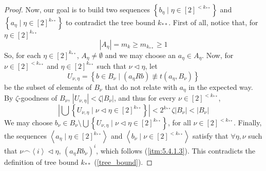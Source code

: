 \begin{proof}
            Now, our goal is to build two sequences $\left\{ b_\eta \mid \eta \in [2]^{<k_{**}} \right\}$ and
            $\left\{ a_\eta \mid \eta \in [2]^{k_{**}} \right\}$ to contradict the tree bound $k_{**}$.
            First of all, notice that, for $\eta \in [2]^{k_{**}}$
            $$
                |A_\eta| = m_k \geq m_{k_{**}} \geq 1
            $$
            So, for each $\eta \in [2]^{k_{**}}$, $A_\eta \neq \emptyset$ and we may choose an $a_\eta \in A_\eta$.
            Now, for $\nu \in [2]^{<k_{**}}$ and $\eta \in [2]^{k_{**}}$ such that $\nu \triangleleft \eta$, let
            $$
                U_{\nu,\eta} = \left\{ b \in B_\nu \mid (a_\eta R b) \not\equiv t(a_\eta, B_\nu) \right\}
            $$
            be the subset of elements of $B_\nu$ that do not relate with $a_\eta$ in the expected way.
            By $\zeta$-goodness of $B_\nu$, $|U_{\nu, \eta}| < \zeta |B_\nu|$, and thus for every $\nu \in [2]^{<k_{**}}$,
            $$
                \left|\bigcup\left\{ U_{\nu,\eta} \mid \nu \triangleleft \eta \in [2]^{k_{**}} \right\}\right| <
                2^{k_{**}} \zeta |B_\nu| < |B_\nu|
            $$
            We may choose $b_\nu \in B_\nu \setminus \bigcup\left\{ U_{\nu,\eta} \mid \nu \triangleleft \eta \in [2]^{k_{**}} \right\}$,
            for all $\nu \in [2]^{<k_{**}}$.
            Finally, the sequences $\left< a_\eta \mid \eta \in [2]^{k_{**}} \right>$ and
            $\left< b_\nu \mid \nu \in [2]^{<k_{**}} \right>$ satisfy that $\forall \eta, \nu$ such that
            $\nu \frown \left< i \right> \triangleleft \eta$, $\left( a_\eta R b_\nu \right)^i$, which follows
            (\ref{itm:5.4.1.3}).
            This contradicts the definition of tree bound $k_{**}$ (\ref{tree_bound}).
        \end{proof}


